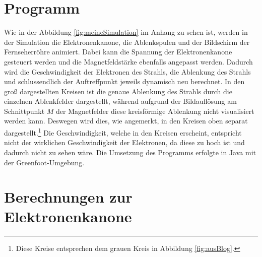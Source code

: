 \section{Programm}
Wie in der Abbildung \ref{fig:meineSimulation} im Anhang zu sehen ist, werden in der Simulation die Elektronenkanone, die Ablenkspulen und der Bildschirm der Fernseherröhre animiert. 
Dabei kann die Spannung der Elektronenkanone gesteuert werden und die Magnetfeldstärke ebenfalls angepasst werden.
Dadurch wird die Geschwindigkeit der Elektronen des Strahls, die Ablenkung des Strahls und schlussendlich der Auftreffpunkt jeweils dynamisch neu berechnet.
In den groß dargestellten Kreisen ist die genaue Ablenkung des Strahls durch die einzelnen Ablenkfelder dargestellt, während aufgrund der Bildauflösung am Schnittpunkt $M$ der Magnetfelder diese kreisförmige Ablenkung nicht visualisiert werden kann.   
Deswegen wird dies, wie angemerkt, in den Kreisen oben separat dargestellt.\footnote{Diese Kreise entsprechen dem grauen Kreis in Abbildung \ref{fig:ausBlog}.}
Die Geschwindigkeit, welche in den Kreisen erscheint, entspricht nicht der wirklichen Geschwindigkeit der Elektronen, da diese zu hoch ist und dadurch nicht zu sehen wäre.
Die Umsetzung des Programms erfolgte in Java mit der Greenfoot-Umgebung.
\label{sec:animation}

\section{Berechnungen zur Elektronenkanone}

\label{sec:tolle-section}
 

